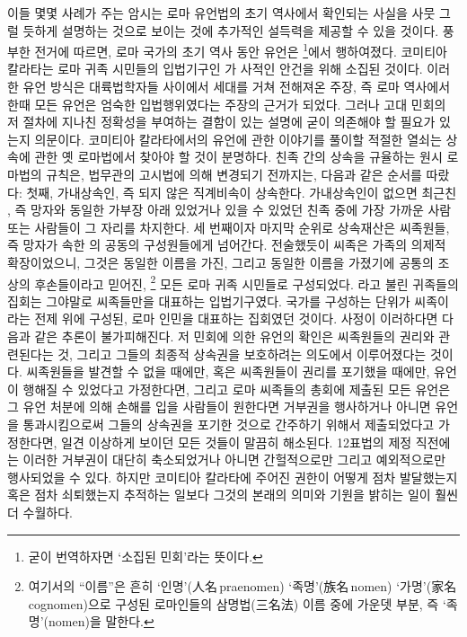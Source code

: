 이들 몇몇 사례가 주는 암시는
로마 유언법의 초기 역사에서 확인되는 사실을 사뭇 그럴 듯하게 설명하는 것으로
보이는 것에 추가적인 설득력을 제공할 수 있을 것이다.
풍부한 전거에 따르면,
로마 국가의 초기 역사 동안 유언은
\footnote{굳이 번역하자면
`소집된 민회'라는 뜻이다.}에서 행하여졌다.
코미티아 칼라타는 로마 귀족 시민들의 입법기구인
가 사적인 안건을 위해 소집된 것이다.
이러한 유언 방식은 대륙법학자들 사이에서 세대를 거쳐 전해져온 주장,
즉 로마 역사에서 한때 모든 유언은 엄숙한 입법행위였다는 주장의
근거가 되었다.
그러나 고대 민회의 저 절차에 지나친 정확성을 부여하는 결함이 있는
설명에 굳이 의존해야 할 필요가 있는지 의문이다.
코미티아 칼라타에서의 유언에 관한 이야기를 풀이할 적절한 열쇠는
상속에 관한 옛 로마법에서 찾아야 할 것이 분명하다.
친족 간의 상속을 규율하는 원시 로마법의 규칙은,
법무관의 고시법에 의해 변경되기 전까지는,
다음과 같은 순서를 따랐다:
첫째, 가내상속인, 즉 되지 않은
직계비속이 상속한다.
가내상속인이 없으면 최근친 ,
즉 망자와 동일한 가부장 아래 있었거나 있을 수 있었던 친족 중에
가장 가까운 사람 또는 사람들이
그 자리를 차지한다.
세 번째이자 마지막 순위로 상속재산은 씨족원들, 즉
망자가 속한 의 공동의 구성원들에게 넘어간다.
전술했듯이 씨족은 가족의 의제적 확장이었으니, 그것은
동일한 이름을 가진,
그리고 동일한 이름을 가졌기에 공통의 조상의 후손들이라고 믿어진,%
\footnote{여기서의 ``이름''은 흔히
  `인명'(人名\,praenomen) `족명'(族名\,nomen) `가명'(家名\,cognomen)으로
  구성된 로마인들의 삼명법(三名法) 이름 중에 가운뎃 부분,
  즉 `족명'(nomen)을 말한다.}
모든 로마 귀족 시민들로 구성되었다.
라고 불린 귀족들의 집회는 그야말로 씨족들만을 대표하는 입법기구였다.
국가를 구성하는 단위가 씨족이라는 전제 위에 구성된,
로마 인민을 대표하는 집회였던 것이다.
사정이 이러하다면 다음과 같은 추론이 불가피해진다.
저 민회에 의한 유언의 확인은 씨족원들의 권리와 관련된다는 것,
그리고 그들의 최종적 상속권을 보호하려는 의도에서 이루어졌다는 것이다.
씨족원들을 발견할 수 없을 때에만,
혹은 씨족원들이 권리를 포기했을 때에만,
유언이 행해질 수 있었다고 가정한다면,
그리고 로마 씨족들의 총회에 제출된 모든 유언은
그 유언 처분에 의해 손해를 입을 사람들이 원한다면 거부권을 행사하거나
아니면 유언을 통과시킴으로써 그들의 상속권을 포기한 것으로 간주하기 위해서
제출되었다고 가정한다면,
일견 이상하게 보이던 모든 것들이 말끔히 해소된다.
12표법의 제정 직전에는 이러한 거부권이 대단히 축소되었거나
아니면 간헐적으로만 그리고 예외적으로만
행사되었을 수 있다.
하지만 코미티아 칼라타에 주어진 권한이 어떻게 점차 발달했는지 혹은
점차 쇠퇴했는지 추적하는 일보다 그것의 본래의 의미와 기원을 밝히는 일이
훨씬 더 수월하다.

